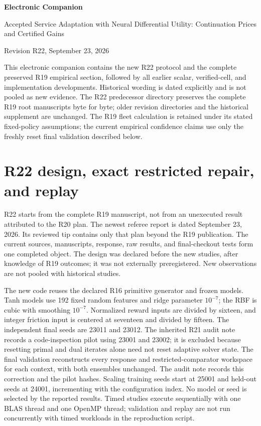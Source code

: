 \documentclass[11pt,letterpaper]{article}
\theoremstyle{definition}
\newcommand{\1}{\mathbf 1}
\begin{document}
\begin{center}{\Large\bfseries Electronic Companion\par}\medskip
{\large Accepted Service Adaptation with Neural Differential Utility: Continuation Prices and Certified Gains\par}\medskip
Revision R22, September 23, 2026
\end{center}
This electronic companion contains the new R22 protocol and the complete preserved R19 empirical section, followed by all earlier scalar, verified-cell, and implementation developments. Historical wording is dated explicitly and is not pooled as new evidence. The R22 predecessor directory preserves the complete R19 root manuscripts byte for byte; older revision directories and the historical supplement are unchanged. The R19 fleet calculation is retained under its stated fixed-policy assumptions; the current empirical confidence claims use only the freshly reset final validation described below.

\section{R22 design, exact restricted repair, and replay}\label{ec:r22-details}
R22 starts from the complete R19 manuscript, not from an unexecuted result attributed to the R20 plan. The newest referee report is dated September 23, 2026. Its reviewed tip contains only that plan beyond the R19 publication. The current sources, manuscripts, response, raw results, and final-checkout tests form one completed object. The design was declared before the new studies, after knowledge of R19 outcomes; it was not externally preregistered. New observations are not pooled with historical studies.

The new code reuses the declared R16 primitive generator and frozen models. Tanh models use 192 fixed random features and ridge parameter $10^{-7}$; the RBF is cubic with smoothing $10^{-7}$. Normalized reward inputs are divided by sixteen, and integer friction input is centered at seventeen and divided by fifteen. The independent final seeds are 23011 and 23012. The inherited R21 audit note records a code-inspection pilot using 23001 and 23002; it is excluded because resetting primal and dual iterates alone need not reset adaptive solver state. The final validation reconstructs every response and restricted-comparator workspace for each context, with both ensembles unchanged. The audit note records this correction and the pilot hashes. Scaling training seeds start at 25001 and held-out seeds at 24001, incrementing with the configuration index. No model or seed is selected by the reported results. Timed studies execute sequentially with one BLAS thread and one OpenMP thread; validation and replay are not run concurrently with timed workloads in the reproduction script.
\end{document}
